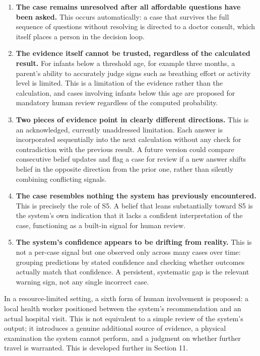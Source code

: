 \documentclass{article}
\begin{document}
\begin{enumerate}
\def\labelenumi{\arabic{enumi}.}
\tightlist
\item
  \textbf{The case remains unresolved after all affordable questions
  have been asked.} This occurs automatically: a case that survives the
  full sequence of questions without resolving is directed to a doctor
  consult, which itself places a person in the decision loop.
\item
  \textbf{The evidence itself cannot be trusted, regardless of the
  calculated result.} For infants below a threshold age, for example
  three months, a parent's ability to accurately judge signs such as
  breathing effort or activity level is limited. This is a limitation of
  the evidence rather than the calculation, and cases involving infants
  below this age are proposed for mandatory human review regardless of
  the computed probability.
\item
  \textbf{Two pieces of evidence point in clearly different directions.}
  This is an acknowledged, currently unaddressed limitation. Each answer
  is incorporated sequentially into the next calculation without any
  check for contradiction with the previous result. A future version
  could compare consecutive belief updates and flag a case for review if
  a new answer shifts belief in the opposite direction from the prior
  one, rather than silently combining conflicting signals.
\item
  \textbf{The case resembles nothing the system has previously
  encountered.} This is precisely the role of S5. A belief that leans
  substantially toward S5 is the system's own indication that it lacks a
  confident interpretation of the case, functioning as a built-in signal
  for human review.
\item
  \textbf{The system's confidence appears to be drifting from reality.}
  This is not a per-case signal but one observed only across many cases
  over time: grouping predictions by stated confidence and checking
  whether outcomes actually match that confidence. A persistent,
  systematic gap is the relevant warning sign, not any single incorrect
  case.
\end{enumerate}

In a resource-limited setting, a sixth form of human involvement is
proposed: a local health worker positioned between the system's
recommendation and an actual hospital visit. This is not equivalent to a
simple review of the system's output; it introduces a genuine additional
source of evidence, a physical examination the system cannot perform,
and a judgment on whether further travel is warranted. This is developed
further in Section 11.
\end{document}
